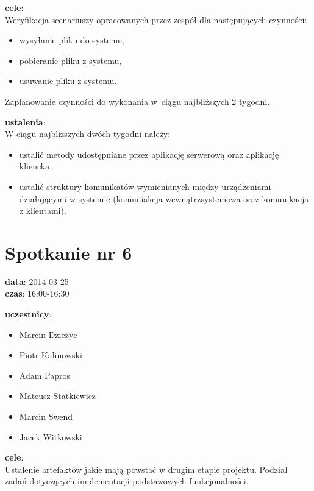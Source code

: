 \vspace{5mm}
\noindent
\textbf{cele}: \\
Weryfikacja scenariuszy opracowanych przez zespół dla następujących czynności:
\begin{itemize}
  \item wysyłanie pliku do systemu,
  \item pobieranie pliku z systemu,
  \item usuwanie pliku z systemu.
\end{itemize}

\vspace{5mm}
Zaplanowanie czynności do wykonania w~ciągu najbliższych 2 tygodni.

\vspace{5mm}
\noindent
\textbf{ustalenia}: \\
W ciągu najbliższych dwóch tygodni należy:
\begin{itemize}
  \item ustalić metody udostępniane przez aplikację serwerową oraz aplikację kliencką,
  \item ustalić struktury komunikatów wymienianych między urządzeniami
  działającymi w systemie (komuniakcja wewnątrzsystemowa oraz komunikacja z klientami).
\end{itemize}

\section[Spotkanie nr 6][Spotkanie nr 6]{Spotkanie nr 6}

\noindent
\textbf{data}: 2014-03-25 \\
\textbf{czas}: 16:00-16:30

\vspace{5mm}
\noindent
\textbf{uczestnicy}:
\begin{itemize}
	\item Marcin Dzieżyc
	\item Piotr Kalinowski
	\item Adam Papros
	\item Mateusz Statkiewicz
	\item Marcin Swend
	\item Jacek Witkowski
\end{itemize}

\vspace{5mm}
\noindent
\textbf{cele}: \\
Ustalenie artefaktów jakie mają powstać w drugim etapie projektu. Podział zadań
dotyczących implementacji podstawowych funkcjonalności.

